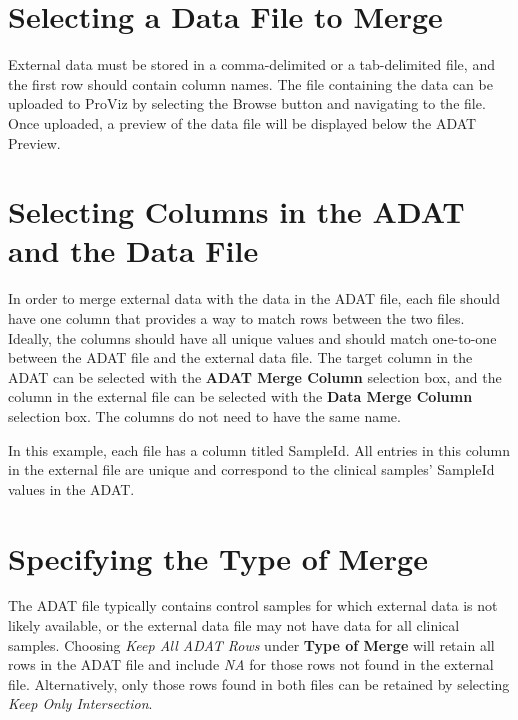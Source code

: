 \documentclass[
]{book}
\begin{document}
\hypertarget{selecting-a-data-file-to-merge}{%
\section{Selecting a Data File to Merge}\label{selecting-a-data-file-to-merge}}

External data must be stored in a comma-delimited or a tab-delimited file, and the first row should contain column names. The file containing the data can be uploaded to ProViz by selecting the Browse button and navigating to the file. Once uploaded, a preview of the data file will be displayed below the ADAT Preview.

\hypertarget{selecting-columns-in-the-adat-and-the-data-file}{%
\section{Selecting Columns in the ADAT and the Data File}\label{selecting-columns-in-the-adat-and-the-data-file}}

In order to merge external data with the data in the ADAT file, each file should have one column that provides a way to match rows between the two files. Ideally, the columns should have all unique values and should match one-to-one between the ADAT file and the external data file. The target column in the ADAT can be selected with the \textbf{ADAT Merge Column} selection box, and the column in the external file can be selected with the \textbf{Data Merge Column} selection box. The columns do not need to have the same name.

In this example, each file has a column titled SampleId. All entries in this column in the external file are unique and correspond to the clinical samples' SampleId values in the ADAT.

\hypertarget{specifying-the-type-of-merge}{%
\section{Specifying the Type of Merge}\label{specifying-the-type-of-merge}}

The ADAT file typically contains control samples for which external data is not likely available, or the external data file may not have data for all clinical samples. Choosing \emph{Keep All ADAT Rows} under \textbf{Type of Merge} will retain all rows in the ADAT file and include \emph{NA} for those rows not found in the external file. Alternatively, only those rows found in both files can be retained by selecting \emph{Keep Only Intersection}.
\end{document}
